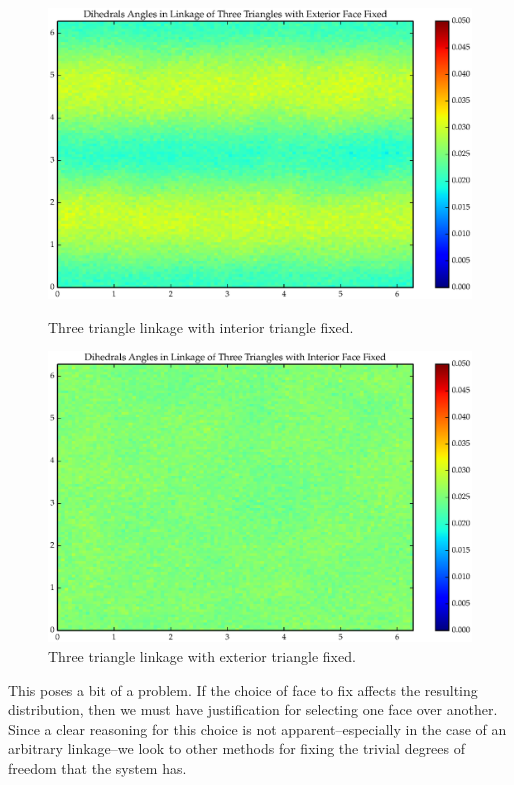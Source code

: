 \begin{figure}[ht]
\centering
  \includegraphics[scale=0.6]{images/T3_3_2D.eps}
\caption{Three triangle linkage with interior triangle fixed.}
\label{fig:T3_3}
  \includegraphics[scale=0.6]{images/T3_4_2D.eps}
\caption{Three triangle linkage with exterior triangle fixed.}
\label{fig:T3_4}
\end{figure}
This poses a bit of a problem. If the choice of face to fix affects the resulting distribution, then we must have justification for selecting one face over another. Since a clear reasoning for this choice is not apparent--especially in the case of an arbitrary linkage--we look to other methods for fixing the trivial degrees of freedom that the system has. 

